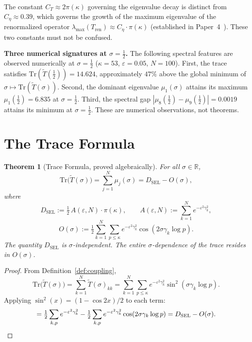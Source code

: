 \documentclass[11pt]{article}
\newtheorem{theorem}{Theorem}[section]
\newcommand{\Tt}{\widetilde{T}}
\newcommand{\DSEL}{D_{\mathrm{SEL}}}
\newcommand{\Ceta}{C_{\eta}}
\newcommand{\CT}{C_{T}}
\begin{document}
The constant $\CT\approx 2\pi(\kappa)$ governing the eigenvalue decay
is distinct from $\Ceta\approx 0.39$, which governs the growth of the
maximum eigenvalue of the renormalized operator
$\lambda_{\max}(T_{\mathrm{ren}})\approx\Ceta\cdot\pi(\kappa)$
(established in Paper~4~\cite{Paper4}).
These two constants must not be confused.

\textbf{Three numerical signatures at $\sigma=\tfrac{1}{2}$.}
The following spectral features are observed numerically at
$\sigma=\tfrac{1}{2}$ ($\kappa=53$, $\varepsilon=0.05$, $N=100$).
First, the trace satisfies $\mathrm{Tr}(\Tt(\tfrac{1}{2}))=14.624$,
approximately $47\%$ above the global minimum of
$\sigma\mapsto\mathrm{Tr}(\Tt(\sigma))$.
Second, the dominant eigenvalue $\mu_1(\sigma)$ attains its maximum
$\mu_1(\tfrac{1}{2})=6.835$ at $\sigma=\tfrac{1}{2}$.
Third, the spectral gap $|\mu_8(\tfrac{1}{2})-\mu_9(\tfrac{1}{2})|=0.0019$
attains its minimum at $\sigma=\tfrac{1}{2}$.
These are numerical observations, not theorems.

\section{The Trace Formula}
\label{sec:trace}

\begin{theorem}[Trace Formula, proved algebraically]
\label{thm:trace}
For all $\sigma\in\mathbb{R}$,
\[
\mathrm{Tr}\bigl(\Tt(\sigma)\bigr)
  = \sum_{j=1}^N \mu_j(\sigma)
  = \DSEL - O(\sigma),
\]
where
\[
\DSEL   := \tfrac{1}{2}\,A(\varepsilon,N)\cdot\pi(\kappa),\qquad
A(\varepsilon,N) := \sum_{k=1}^N e^{-\varepsilon^2\gamma_k^2},
\]
\[
O(\sigma) := \tfrac{1}{2}\sum_{k=1}^N\sum_{p\leq\kappa}
             e^{-\varepsilon^2\gamma_k^2}\cos(2\sigma\gamma_k\log p).
\]
The quantity $\DSEL$ is $\sigma$-independent.
The entire $\sigma$-dependence of the trace resides in $O(\sigma)$.
\end{theorem}

\begin{proof}
From Definition~\ref{def:coupling},
\[
\mathrm{Tr}\bigl(\Tt(\sigma)\bigr)
  = \sum_{k=1}^N \Tt(\sigma)_{kk}
  = \sum_{k=1}^N\sum_{p\leq\kappa}
    e^{-\varepsilon^2\gamma_k^2}\sin^2(\sigma\gamma_k\log p).
\]
Applying $\sin^2(x)=(1-\cos 2x)/2$ to each term:
\[
= \tfrac{1}{2}\sum_{k,p} e^{-\varepsilon^2\gamma_k^2}
  - \tfrac{1}{2}\sum_{k,p} e^{-\varepsilon^2\gamma_k^2}\cos(2\sigma\gamma_k\log p)
  = \DSEL - O(\sigma). \qedhere
\]
\end{proof}
\end{document}
